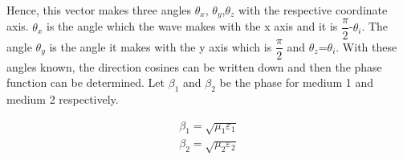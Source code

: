 Hence, this vector makes three angles $\theta_x$, $\theta_y$,$\theta_z$ with the respective coordinate axis. $\theta_x$ is the angle which the wave makes with the x axis and it is $\dfrac{\pi}{2}$-$\theta_i$. The angle $\theta_y$ is the angle it makes with the y axis which is $\dfrac{\pi}{2}$ and $\theta_z$=$\theta_i$. With these angles known, the direction cosines can be written down and then the phase function can be determined. Let $\beta_1$ and $\beta_2$ be the phase for medium 1 and medium 2 respectively.

\begin{align*}
\beta_1=\sqrt{\mu_1\varepsilon_1}\\
\beta_2=\sqrt{\mu_2\varepsilon_2}  
\end{align*}
\begin{equation}\end{equation}

